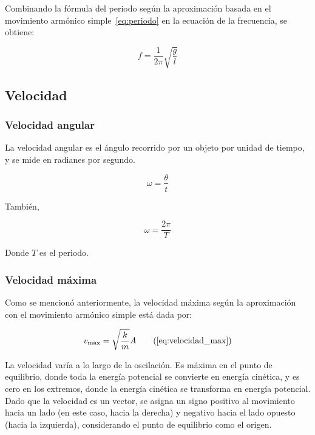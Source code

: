 \documentclass[twocolumn]{article}
\numberwithin{table}{section}
\begin{document}
Combinando la fórmula del periodo según la aproximación basada en
el movimiento armónico simple~\eqref{eq:periodo} en la ecuación de la
frecuencia, se obtiene:

\begin{equation}
  f = \frac{1}{2\pi}\sqrt{\frac{g}{l}}
\end{equation}

\subsection{Velocidad}

\subsubsection{Velocidad angular}

La velocidad angular es el ángulo recorrido por un objeto por unidad
de tiempo, y se mide en radianes por segundo.

\begin{equation}
  \omega = \frac{\theta}{t} \label{eq:velocidad_angular}
\end{equation}

También,

\begin{equation}
  \omega = \frac{2\pi}{T}
\end{equation}

Donde $T$ es el periodo.

\subsubsection{Velocidad máxima}

Como se mencionó anteriormente, la velocidad máxima según la
aproximación con el movimiento armónico simple está dada por:

\begin{equation}
  v_{\max} = \sqrt{\frac{k}{m}}A \tag{\ref{eq:velocidad_max}}
\end{equation}

La velocidad varía a lo largo de la oscilación. Es máxima en el punto
de equilibrio, donde toda la energía potencial se convierte en
energía cinética, y es cero en los extremos, donde la energía
cinética se transforma en energía potencial. Dado que la velocidad es
un vector, se asigna un signo positivo al movimiento hacia un lado
(en este caso, hacia la derecha) y negativo hacia el lado opuesto
(hacia la izquierda), considerando el punto de equilibrio como el origen.
\end{document}
